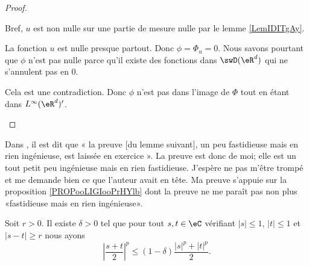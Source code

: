 \begin{proof}
\begin{subproof}
		Bref, \( u\) est non nulle sur une partie de mesure nulle par le lemme \ref{LemIDITgAy}.

		\spitem[Conclusion]

		La fonction \( u\) est nulle presque partout. Donc \( \phi=\Phi_u=0\). Nous savons pourtant que \( \phi\) n'est pas nulle parce qu'il existe des fonctions dans \( \swD(\eR^d)\) qui ne s'annulent pas en \( 0\).

		Cela est une contradiction. Donc \( \phi\) n'est pas dans l'image de \( \Phi\) tout en étant dans \( L^{\infty}(\eR^d)'\).

	\end{subproof}
\end{proof}

Dans \cite{ooHGADooNGZnbt}, il est dit que « la preuve [du lemme suivant], un peu fastidieuse mais en rien ingénieuse, est laissée en exercice ». La preuve est donc de moi; elle est un tout petit peu ingénieuse mais en rien fastidieuse. J'espère ne pas m'être trompé et me demande bien ce que l'auteur avait en tête. Ma preuve s'appuie sur la proposition \ref{PROPooLIGIooPrHYlb} dont la preuve ne me paraît pas non plus «fastidieuse mais en rien ingénieuse».

\begin{lemma}        \label{LEMooLDQRooEGWDlm}
	Soit \( r>0\). Il existe \( \delta>0\) tel que pour tout \( s,t\in \eC\) vérifiant \( | s |\leq 1\), \( | t |\leq 1\) et \( | s-t |\geq r\) nous ayons
	\begin{equation}
		\left| \frac{ s+t }{ 2 } \right|^p\leq (1-\delta)\frac{ | s |^p+| t |^p }{2}.
	\end{equation}
\end{lemma}

